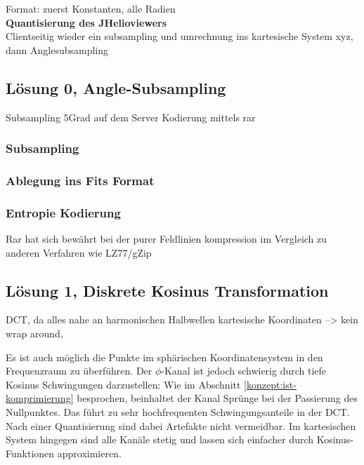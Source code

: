 Format: zuerst Konstanten, alle Radien\\
[\baselineskip]
\textbf{Quantisierung des JHelioviewers}\\
Clientseitig wieder ein subsampling und umrechnung ins kartesische System xyz, dann Anglesubsampling
	
\subsection{Lösung 0, Angle-Subsampling}
Subsampling 5Grad auf dem Server
Kodierung mittels rar
\subsubsection{Subsampling}\label{konzept:loesung0:subsampling}

\subsubsection{Ablegung ins Fits Format} \label{konzept:loesung0:fits}

\subsubsection{Entropie Kodierung} \label{konzept:loesung0:kodierung}
Rar hat sich bewährt bei der purer Feldlinien kompression im Vergleich zu anderen Verfahren wie LZ77/gZip

\subsection{Lösung 1, Diskrete Kosinus Transformation}
DCT, da alles nahe an harmonischen Halbwellen
kartesische Koordinaten --> kein wrap around,

Es ist auch möglich die Punkte im sphärischen Koordinatensystem in den Frequenzraum zu überführen. Der $\phi$-Kanal ist jedoch schwierig durch tiefe Kosinus Schwingungen darzustellen: Wie im Abschnitt \ref{konzept:ist-komprimierung} besprochen, beinhaltet der Kanal Sprünge bei der Passierung des Nullpunktes. Das führt zu sehr hochfrequenten Schwingungsanteile in der DCT. Nach einer Quantisierung sind dabei Artefakte nicht vermeidbar. Im kartesischen System hingegen sind alle Kanäle stetig und lassen sich einfacher durch Kosinus-Funktionen approximieren.\\

